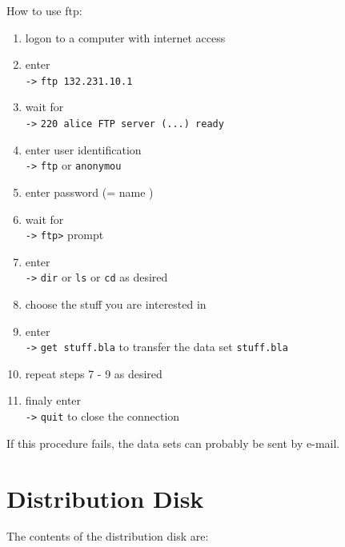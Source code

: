 How to use ftp:
\begin{enumerate}
\item logon to a computer with internet access
\item enter \\
            \verb/->/ \verb*/ftp 132.231.10.1/
\item wait for \\
            \verb/->/ \verb/220 alice FTP server (...) ready/
\item enter user identification \\
            \verb/->/ \verb/ftp/ or \verb/anonymou/
\item enter password (= name )
\item wait for \\
            \verb/->/ \verb/ftp>/ prompt
\item enter \\
            \verb/->/ \verb/dir/ or \verb/ls/ or \verb/cd/ as desired
\item choose the stuff you are interested in
\item enter \\
            \verb/->/ \verb*/get stuff.bla/   
               to transfer the data set \verb/stuff.bla/
\item repeat steps 7 - 9 as desired
\item finaly enter \\
            \verb/->/ \verb/quit/ to close the connection
\end{enumerate}

If this procedure fails, the data sets can probably 
be sent by e-mail.

\section{Distribution Disk}

The contents of the distribution disk are:


